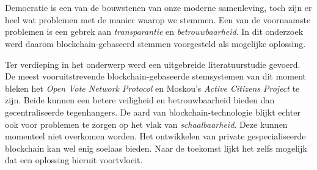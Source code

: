 
%
%

%



\chapter*{}

Democratie is een van de bouwstenen van onze moderne samenleving, toch zijn er heel wat problemen met de manier waarop we stemmen. 
Een van de voornaamste problemen is een gebrek aan \textit{transparantie} en \textit{betrouwbaarheid}. In dit onderzoek werd daarom blockchain-gebaseerd stemmen voorgesteld als mogelijke oplossing. 

Ter verdieping in het onderwerp werd een uitgebreide literatuurstudie gevoerd. De meest vooruitstrevende blockchain-gebaseerde stemsystemen van dit moment bleken het \textit{Open Vote Network Protocol} en Moskou's \textit{Active Citizens Project} te zijn. Beide kunnen een betere veiligheid en betrouwbaarheid bieden dan gecentraliseerde tegenhangers. De aard van blockchain-technologie blijkt echter ook voor problemen te zorgen op het vlak van \textit{schaalbaarheid}. Deze kunnen momenteel niet overkomen worden. Het ontwikkelen van private gespecialiseerde blockchain kan wel enig soelaas bieden. Naar de toekomst lijkt het zelfs mogelijk dat een oplossing hieruit voortvloeit.  

